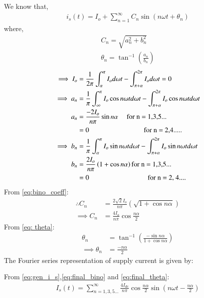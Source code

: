 \documentclass[journal,12pt,onecolumn]{IEEEtran}
\theoremstyle{remark}
\begin{document}
We know that,
\begin{align}
    i_s(t) = I_o +\sum_{n=1}^{\infty}C_n\sin({n\omega t} + \theta_n)\label{eq:gen_i_s}
\end{align}
 where,
 \begin{align}
     C_n = \sqrt{a_n^2 + b_n ^2}\label{eq:bino_coeff}\\
     \theta_n = \tan^{-1}\left({\frac{a_n}{b_n}}\right)\label{eq: theta}
 \end{align}
\begin{align}
  \implies  I_o &= \frac{1}{2\pi}\int_{\alpha}^{\pi} I_o d\omega t - \int_{\pi + \alpha}^{2\pi} I_o d\omega t = 0\\
 \implies   a_n &= \frac{1}{\pi} \int_{\infty}^{\pi}I_o\cos n\omega t d\omega t - \int_{\pi + \alpha}^{2\pi} I_o\cos{n\omega td\omega t}\\
    a_n&=\frac{-2I_o}{n\pi}\sin{n\alpha} \quad \mbox{ for n = 1,3,5...}\nonumber\\
    &= 0  \hspace{2.8cm} \mbox{for n = 2,4.....}\nonumber\\
 \implies   b_n &= \frac{1}{\pi}\int_{\alpha}^{\pi}I_o\sin n\omega t d\omega t - \int_{\pi + \alpha}^{2\pi} I_o\sin{n\omega td\omega t} \\
    b_n &= \frac{2I_o}{n\pi}\left(1 + \cos{n\alpha}\right) \mbox{for n = 1,3,5...}\nonumber\\
    &=0 \hspace{3cm} \mbox{for n = 2, 4....}\nonumber
\end{align}
From \eqref{eq:bino_coeff}:
\begin{align}
  \therefore  C_n &= \frac{2\sqrt{2}I_o}{n\pi}\left(\sqrt{1 + \cos{n\alpha}}\right)\\
  \implies  C_n &= \frac{4I_o}{n\pi}\cos{\frac{n\alpha}{2}}\label{eq:final_bino}
\end{align}
From \eqref{eq: theta}:
\begin{align}
    \theta_n &= \tan^{-1}\left(\frac{-\sin{n\alpha}}{1 + \cos{n\alpha}}\right)\\
    \implies \theta_n &= \frac{-n\alpha}{2}\label{eq:final_theta}
\end{align}
The Fourier series representation of supply current is given by:

From \eqref{eq:gen_i_s},\eqref{eq:final_bino} and \eqref{eq:final_theta}:
\begin{align}
I_{s}(t) = \sum_{n=1,3,5...}^{\infty} \frac{4I_{dc}}{n\pi}\cos{\frac{n\alpha}{2}}\sin{\left(n\omega t - \frac{n\alpha}{2}\right)}
\end{align}
\end{document}
